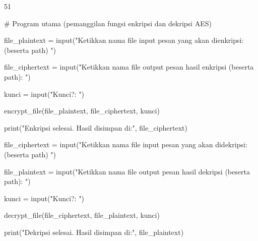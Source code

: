 \documentclass{article}
\begin{document}

51

\# Program utama (pemanggilan fungsi enkripsi dan dekripsi AES)

file\_plaintext = input("Ketikkan nama file input pesan yang akan dienkripsi: (beserta path) ")

file\_ciphertext = input("Ketikkan nama file output pesan hasil enkripsi (beserta path): ")

kunci = input("Kunci?: ")

encrypt\_file(file\_plaintext, file\_ciphertext, kunci)

print("Enkripsi selesai. Hasil disimpan di:", file\_ciphertext)

file\_ciphertext = input("Ketikkan nama file input pesan yang akan didekripsi: (beserta path) ")

file\_plaintext = input("Ketikkan nama file output pesan hasil dekripsi (beserta path): ")

kunci = input("Kunci?: ")

decrypt\_file(file\_ciphertext, file\_plaintext, kunci)

print("Dekripsi selesai. Hasil disimpan di:", file\_plaintext)
\end{document}
